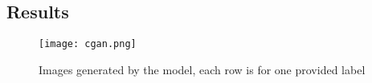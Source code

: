 \documentclass[12pt]{scrartcl}
\begin{document}
    \subsection{Results}

    \begin{center}
        \begin{figure}[H]
            \texttt{[image: cgan.png]}
            \caption{Images generated by the model, each row is for one provided label}
        \end{figure}
    \end{center}
\end{document}

